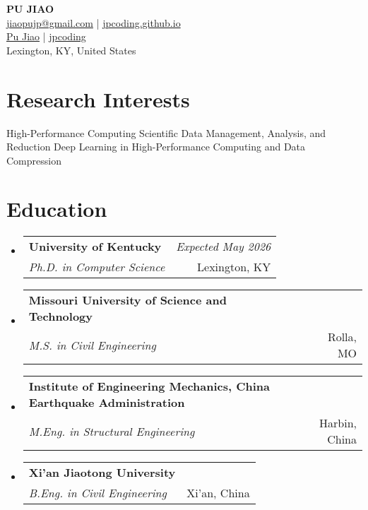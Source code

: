 \documentclass[a4paper,11pt]{article}
\makeatletter
\newcommand{\resumeSubheading}[4]{
\vspace{0.5mm}\item
    \begin{tabular*}{0.98\textwidth}[t]{l@{\extracolsep{\fill}}r}
        \textbf{#1} & \textit{\footnotesize{#4}} \\
        \textit{\footnotesize{#3}} &  \footnotesize{#2}\\
    \end{tabular*}
    \vspace{-2.4mm}
}
\newcommand{\resumeSubHeadingListStart}{\begin{itemize}[leftmargin=*,labelsep=1mm]}
\newcommand{\resumeSubHeadingListEnd}{\end{itemize}\vspace{2mm}}
\newcommand{\socialicon}[1]{\raisebox{-0.05em}{\resizebox{!}{1em}{#1}}}
\newcommand{\headerfontiii}{\fontfamily{ppl}\selectfont} %
\makeatother
\begin{document}
\headerfontiii

\begin{center}
    {\Huge\textbf{PU JIAO}}\\[0.5em]
    \small{
    \href{mailto:jiaopujp@gmail.com}{jiaopujp@gmail.com} | 
    \href{https://jpcoding.github.io/}{jpcoding.github.io}
    }\\[0.3em]
    \small{
    \socialicon{\faLinkedin} \href{https://www.linkedin.com/in/pu-jiao-4b309b212/}{Pu Jiao} | 
    \socialicon{\faGithub} \href{https://github.com/jpcoding}{jpcoding}
    }\\[0.2em]
    \small{Lexington, KY, United States}
\end{center}

\vspace{-4mm}


\section{\textbf{Research Interests}}
\vspace{-0.4mm}
\small{
High-Performance Computing 
Scientific Data Management, Analysis, and Reduction 
Deep Learning in High-Performance Computing and Data Compression
}
\vspace{-2mm}

\section{\textbf{Education}}
\vspace{-0.4mm}
\resumeSubHeadingListStart

\resumeSubheading
{University of Kentucky}{Lexington, KY}
{Ph.D. in Computer Science}{Expected May 2026}

\resumeSubheading
{Missouri University of Science and Technology}{Rolla, MO}
{M.S. in Civil Engineering}{}

\resumeSubheading
{Institute of Engineering Mechanics, China Earthquake Administration}{Harbin, China}
{M.Eng. in Structural Engineering}{}

\resumeSubheading
{Xi'an Jiaotong University}{Xi'an, China}
{B.Eng. in Civil Engineering}{}

\resumeSubHeadingListEnd
\vspace{-6mm}
\end{document}
